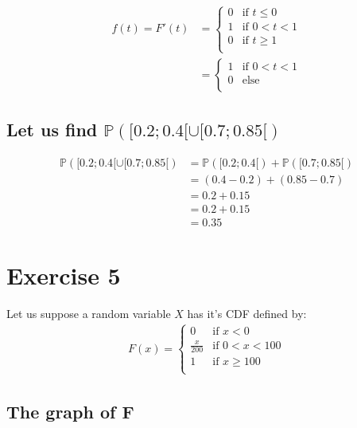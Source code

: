 \documentclass[11pt]{article}
\def\lt{<}
\begin{document}
  \begin{align*}
f(t)=F'(t) &= \begin{cases}
            0 & \text{if } t \le 0\\
            1 & \text{if } 0 \lt t \lt 1\\
            0 & \text{if } t \geq 1\\
        \end{cases}\\
        &=\begin{cases}
        1 & \text{if } 0 \lt t \lt 1\\
            0 & \text{else }\\
        \end{cases}
\end{align*} 
    
\subsection{Let us find $\mathbb{P}([0.2 ;0.4[\cup [0.7;0.85[)$}

\begin{align*}
\mathbb{P}([0.2 ;0.4[\cup [0.7;0.85[)
       &=\mathbb{P}([0.2 ;0.4[)+\mathbb{P}([0.7;0.85[)\\
       &=(0.4-0.2)+(0.85-0.7)\\
       &=0.2+0.15\\
       &=0.2+0.15\\
       &=0.35
\end{align*}
   
\newpage 
    \section{Exercise 5}
    
    Let us suppose a random variable $X$ has it's CDF defined by:\\
    
\begin{align*}
F(x) = \begin{cases}
            0 & \text{if } x \lt 0\\
            \frac{x}{200} & \text{if } 0 \lt x \lt 100\\
            1 & \text{if } x \geq 100\\
        \end{cases}
\end{align*}

\subsection{The graph of F}
\end{document}
